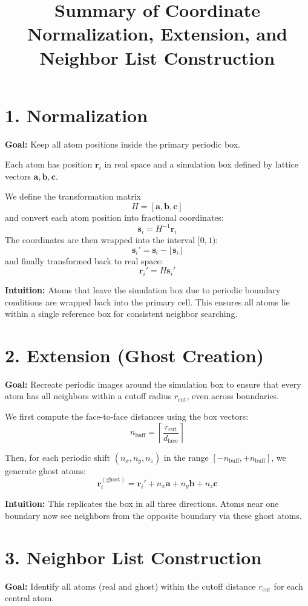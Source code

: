\documentclass[12pt,a4paper]{article}
\title{Summary of Coordinate Normalization, Extension, and Neighbor List Construction}
\author{}
\date{}
\begin{document}
\maketitle

\section*{1. Normalization}
\textbf{Goal:} Keep all atom positions inside the primary periodic box.

Each atom has position $\mathbf{r}_i$ in real space and a simulation box defined by lattice vectors $\mathbf{a}, \mathbf{b}, \mathbf{c}$.

We define the transformation matrix
\[
H = [\mathbf{a}, \mathbf{b}, \mathbf{c}]
\]
and convert each atom position into fractional coordinates:
\[
\mathbf{s}_i = H^{-1}\mathbf{r}_i
\]
The coordinates are then wrapped into the interval $[0,1)$:
\[
\mathbf{s}_i' = \mathbf{s}_i - \lfloor \mathbf{s}_i \rfloor
\]
and finally transformed back to real space:
\[
\mathbf{r}_i' = H \mathbf{s}_i'
\]

\textbf{Intuition:}  
Atoms that leave the simulation box due to periodic boundary conditions are wrapped back into the primary cell.  
This ensures all atoms lie within a single reference box for consistent neighbor searching.

\bigskip

\section*{2. Extension (Ghost Creation)}
\textbf{Goal:} Recreate periodic images around the simulation box to ensure that every atom has all neighbors within a cutoff radius $r_{\text{cut}}$, even across boundaries.

We first compute the face-to-face distances using the box vectors:
\[
n_{\text{buff}} = \left\lceil \frac{r_{\text{cut}}}{d_{\text{face}}} \right\rceil
\]

Then, for each periodic shift $(n_x, n_y, n_z)$ in the range $[-n_{\text{buff}}, +n_{\text{buff}}]$, we generate ghost atoms:
\[
\mathbf{r}_{i}^{(\text{ghost})} = \mathbf{r}_i' + n_x \mathbf{a} + n_y \mathbf{b} + n_z \mathbf{c}
\]

\textbf{Intuition:}  
This replicates the box in all three directions.  
Atoms near one boundary now see neighbors from the opposite boundary via these ghost atoms.

\bigskip

\section*{3. Neighbor List Construction}
\textbf{Goal:} Identify all atoms (real and ghost) within the cutoff distance $r_{\text{cut}}$ for each central atom.
\end{document}
